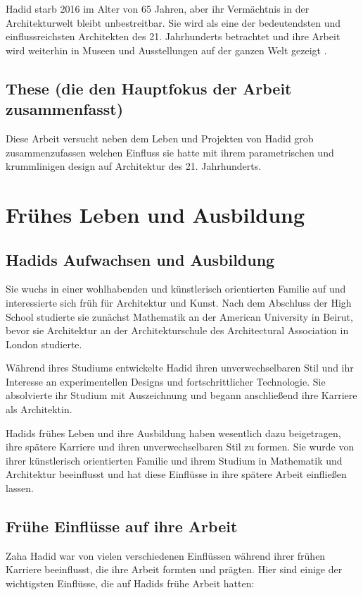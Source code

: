 \documentclass[a4paper, 12p]{article}
\begin{document}
Hadid starb 2016 im Alter von 65 Jahren, aber ihr Vermächtnis in der
Architekturwelt bleibt unbestreitbar. Sie wird als eine der bedeutendsten und
einflussreichsten Architekten des 21. Jahrhunderts betrachtet und ihre Arbeit
wird weiterhin in Museen und Ausstellungen auf der ganzen Welt gezeigt
\cite{hadid_britannica}.

\subsection{These (die den Hauptfokus der Arbeit zusammenfasst)}
Diese Arbeit versucht neben dem Leben und Projekten von Hadid grob
zusammenzufassen welchen Einfluss sie hatte mit ihrem parametrischen und
krummlinigen design auf Architektur des 21. Jahrhunderts.


\section{Frühes Leben und Ausbildung}
\subsection{Hadids Aufwachsen und Ausbildung}
Sie wuchs in einer wohlhabenden und künstlerisch orientierten Familie auf und
interessierte sich früh für Architektur und Kunst. Nach dem Abschluss der High
School studierte sie zunächst Mathematik an der American University in Beirut,
bevor sie Architektur an der Architekturschule des Architectural Association in
London studierte.

Während ihres Studiums entwickelte Hadid ihren unverwechselbaren Stil und ihr
Interesse an experimentellen Designs und fortschrittlicher Technologie. Sie
absolvierte ihr Studium mit Auszeichnung und begann anschließend ihre Karriere
als Architektin.

Hadids frühes Leben und ihre Ausbildung haben wesentlich dazu beigetragen, ihre
spätere Karriere und ihren unverwechselbaren Stil zu formen. Sie wurde von ihrer
künstlerisch orientierten Familie und ihrem Studium in Mathematik und
Architektur beeinflusst und hat diese Einflüsse in ihre spätere Arbeit
einfließen lassen.
\subsection{Frühe Einflüsse auf ihre Arbeit}
Zaha Hadid war von vielen verschiedenen Einflüssen während ihrer frühen Karriere
beeinflusst, die ihre Arbeit formten und prägten. Hier sind einige der
wichtigsten Einflüsse, die auf Hadids frühe Arbeit hatten:
\end{document}
